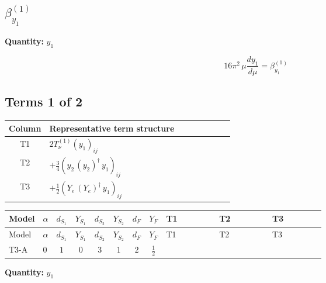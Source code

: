 \documentclass[8pt]{article}
\begin{document}
\begin{landscape}
\section*{$\beta_{y_1}^{(1)}$}
\noindent\textbf{Quantity: }$y_1$\par\smallskip
\[16\pi^2\,\mu\frac{d y_1}{d\mu}=\beta_{y_1}^{(1)}\]
\subsection*{Terms 1 of 2}
\begin{center}
\begin{tabular}{@{}c >{\raggedright\arraybackslash}p{0.82\linewidth}@{}}
\toprule
Column & Representative term structure \\
\midrule
T1 & \(\displaystyle 2 T_{\nu}^{(1)} \left({y_1}\right)_{ij}\) \\
\midrule
T2 & \(\displaystyle +\frac{3}{4} \left({y_2}\,\left({y_2}\right)^{\dagger}\,{y_1}\right)_{ij}\) \\
\midrule
T3 & \(\displaystyle +\frac{1}{2} \left({Y_e}\,\left({Y_e}\right)^{\dagger}\,{y_1}\right)_{ij}\) \\
\midrule
\bottomrule
\end{tabular}
\end{center}
\smallskip
\tiny
\begin{longtable}{@{}llcccccc >{\raggedright\arraybackslash}p{0.21\linewidth} >{\raggedright\arraybackslash}p{0.21\linewidth} >{\raggedright\arraybackslash}p{0.21\linewidth}@{}}
\toprule
Model & $\alpha$ & $d_{S_1}$ & $Y_{S_1}$ & $d_{S_2}$ & $Y_{S_2}$ & $d_F$ & $Y_F$ & T1 & T2 & T3 \\
\midrule
\endfirsthead
\toprule
Model & $\alpha$ & $d_{S_1}$ & $Y_{S_1}$ & $d_{S_2}$ & $Y_{S_2}$ & $d_F$ & $Y_F$ & T1 & T2 & T3 \\
\midrule
\endhead
T3-A & $0$ & $1$ & $0$ & $3$ & $1$ & $2$ & $\frac{1}{2}$ & \scriptsize\adjustbox{max width=\linewidth}{$\begin{gathered} 2 T_{\nu}^{(1)} \left({y_1}\right)_{ij}\end{gathered}$} & \scriptsize\adjustbox{max width=\linewidth}{$\begin{gathered} +\frac{3}{4} \left({y_2}\,\left({y_2}\right)^{\dagger}\,{y_1}\right)_{ij}\end{gathered}$} & \scriptsize\adjustbox{max width=\linewidth}{$\begin{gathered} +\frac{1}{2} \left({Y_e}\,\left({Y_e}\right)^{\dagger}\,{y_1}\right)_{ij}\end{gathered}$} \\
\midrule
\bottomrule
\end{longtable}
\clearpage
\noindent\textbf{Quantity: }$y_1$\par\smallskip

\end{landscape}
\end{document}
